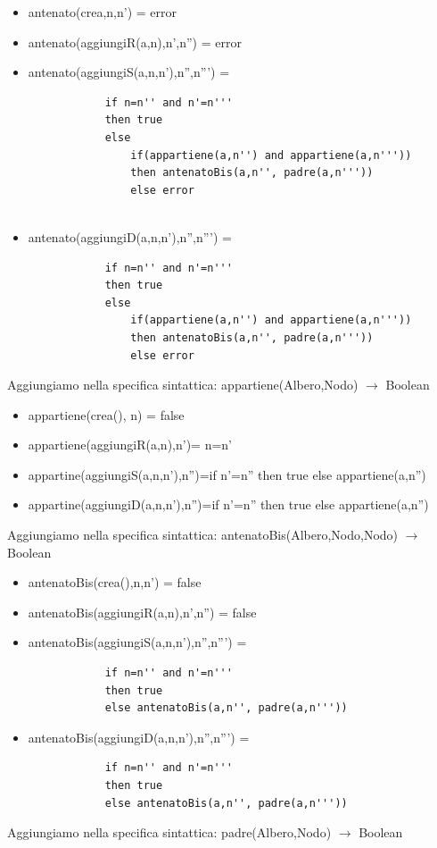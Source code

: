 \documentclass{article}
\begin{document}
	\begin{itemize}
		\item antenato(crea,n,n') = error
		\item antenato(aggiungiR(a,n),n',n'') = error
		\item antenato(aggiungiS(a,n,n'),n'',n''') = 
		\begin{verbatim}
			if n=n'' and n'=n'''
			then true 
			else 
				if(appartiene(a,n'') and appartiene(a,n''')) 
				then antenatoBis(a,n'', padre(a,n'''))
				else error
			
		\end{verbatim}
		\item antenato(aggiungiD(a,n,n'),n'',n''') = 
		\begin{verbatim}
			if n=n'' and n'=n'''
			then true 
			else 
				if(appartiene(a,n'') and appartiene(a,n''')) 
				then antenatoBis(a,n'', padre(a,n'''))
				else error
		\end{verbatim}
	\end{itemize}
	Aggiungiamo nella specifica sintattica: appartiene(Albero,Nodo) $\rightarrow$ Boolean
	\begin{itemize}
		\item appartiene(crea(), n) = false
		\item appartiene(aggiungiR(a,n),n')= n=n'
		\item appartine(aggiungiS(a,n,n'),n'')=if n'=n'' then true else appartiene(a,n'')
		\item appartine(aggiungiD(a,n,n'),n'')=if n'=n'' then true else appartiene(a,n'')	
	\end{itemize}
	Aggiungiamo nella specifica sintattica: antenatoBis(Albero,Nodo,Nodo) $\rightarrow$ Boolean
	\begin{itemize}
		\item antenatoBis(crea(),n,n') = false
		\item antenatoBis(aggiungiR(a,n),n',n'') = false
		\item antenatoBis(aggiungiS(a,n,n'),n'',n''') =
		\begin{verbatim}
			if n=n'' and n'=n'''
			then true 
			else antenatoBis(a,n'', padre(a,n'''))
		\end{verbatim}
		\item antenatoBis(aggiungiD(a,n,n'),n'',n''') =	
		\begin{verbatim}
			if n=n'' and n'=n'''
			then true 
			else antenatoBis(a,n'', padre(a,n'''))
		\end{verbatim}
	\end{itemize}
	Aggiungiamo nella specifica sintattica: padre(Albero,Nodo) $\rightarrow$ Boolean
\end{document}
